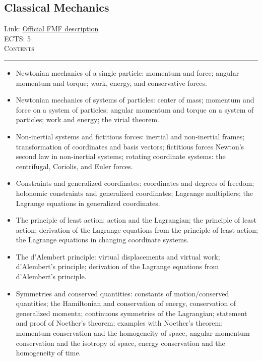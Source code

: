 \documentclass[11pt, a4paper]{article}
\newenvironment{course}[3]{
\subsection{#1}%
Link: \href{#2}{Official FMF description}\\%
ECTS: #3%
\vspace{1ex}
\\
{\large \textsc{Contents}}\\[-0.9ex]%
\rule{\textwidth}{0.5pt}
\vspace{-3ex}
}
{}
\newenvironment{chapter}[1]{
\begin{tcolorbox}[title=#1, breakable]
}
{\end{tcolorbox}}
\begin{document}
\begin{course}{Classical Mechanics}{https://www.fmf.uni-lj.si/en/study-physics/programmes/1fiz/2020/7000777/courses/1155/}{5}
    \label{classical_mechanics}

    \begin{chapter}{Review of Newtonian mechanics}
        \begin{itemize}
        
            \item Newtonian mechanics of a single particle: momentum and force; angular momentum and torque; work, energy, and conservative forces.

            \item Newtonian mechanics of systems of particles: center of mass; momentum and force on a system of particles; angular momentum and torque on a system of particles; work and energy; the virial theorem.

            \item Non-inertial systems and fictitious forces: inertial and non-inertial frames; transformation of coordinates and basis vectors; fictitious forces Newton's second law in non-inertial systems; rotating coordinate systems: the centrifugal, Coriolis, and Euler forces.
        
        \end{itemize}
    \end{chapter}

    \begin{chapter}{Lagrangian mechanics}
        \begin{itemize}
        
            \item Constraints and generalized coordinates: coordinates and degrees of freedom; holonomic constraints and generalized coordinates; Lagrange multipliers; the Lagrange equations in generalized coordinates.

            \item The principle of least action: action and the Lagrangian; the principle of least action; derivation of the Lagrange equations from the principle of least action; the Lagrange equations in changing coordinate systems.

            \item The d'Alembert principle: virtual displacements and virtual work; d'Alembert's principle; derivation of the Lagrange equations from d'Alembert's principle.

            \item Symmetries and conserved quantities: constants of motion/conserved quantities; the Hamiltonian and conservation of energy, conservation of generalized momenta; continuous symmetries of the Lagrangian; statement and proof of Noether's theorem; examples with Noether's theorem: momentum conservation and the homogeneity of space, angular momentum conservation and the isotropy of space, energy conservation and the homogeneity of time.


\end{itemize}
\end{chapter}
\end{course}
\end{document}

